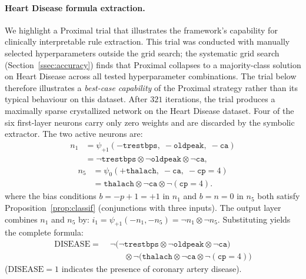 \documentclass[lettersize,journal]{IEEEtran}
\newcommand{\tnorm}{\otimes}      %
\begin{document}
\paragraph{Heart Disease formula extraction.}
\label{ssec:heart}
We highlight a Proximal trial that illustrates the framework's capability for
clinically interpretable rule extraction.
This trial was conducted with manually selected hyperparameters outside the
grid search; the systematic grid search (Section~\ref{ssec:accuracy}) finds
that Proximal collapses to a majority-class solution on Heart Disease across
all tested hyperparameter combinations.
The trial below therefore illustrates a \emph{best-case capability} of the
Proximal strategy rather than its typical behaviour on this dataset.
After $321$ iterations, the trial produces a maximally sparse
crystallized network on the Heart Disease dataset.
Four of the six first-layer neurons carry only zero weights and are discarded
by the symbolic extractor.
The two active neurons are:
\begin{equation}\label{eq:n1}
\begin{split}
  n_1 &= \psi_{+1}(-\mathtt{trestbps},\; -\mathtt{oldpeak},\; -\mathtt{ca}) \\
      &= \neg\mathtt{trestbps} \tnorm \neg\mathtt{oldpeak} \tnorm \neg\mathtt{ca},
\end{split}
\end{equation}
\begin{equation}\label{eq:n5}
\begin{split}
  n_5 &= \psi_{0}(+\mathtt{thalach},\; -\mathtt{ca},\; -\mathtt{cp}{=}4) \\
      &= \mathtt{thalach} \tnorm \neg\mathtt{ca} \tnorm \neg(\mathtt{cp}{=}4).
\end{split}
\end{equation}
where the bias conditions $b = -p+1 = +1$ in $n_1$ and $b = n = 0$ in $n_5$
both satisfy Proposition~\ref{prop:classif} (conjunctions with three inputs).
The output layer combines $n_1$ and $n_5$ by:
$i_1 = \psi_{+1}(-n_1, -n_5) = \neg n_1 \tnorm \neg n_5$.
Substituting yields the complete formula:
\begin{equation}
  \boxed{
    \begin{aligned}
      \mathrm{DISEASE} =&\;
      \neg\!\bigl(\neg\mathtt{trestbps} \tnorm \neg\mathtt{oldpeak}
                  \tnorm \neg\mathtt{ca}\bigr) \\
      &\qquad \tnorm
      \neg\!\bigl(\mathtt{thalach} \tnorm \neg\mathtt{ca}
                  \tnorm \neg(\mathtt{cp}{=}4)\bigr)
    \end{aligned}
  }
  \label{eq:heart_formula}
\end{equation}
($\mathrm{DISEASE} = 1$ indicates the presence of coronary artery disease).
\end{document}
